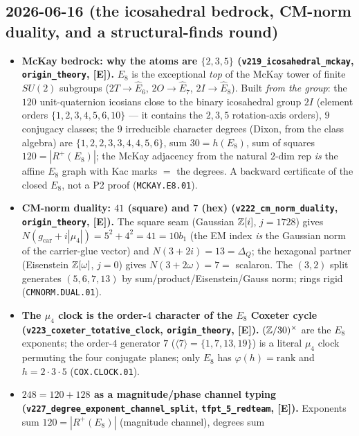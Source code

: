 \documentclass[11pt]{article}
\providecommand{\mE}{\textbf{[E]}}\providecommand{\mC}{\textbf{[C]}}
\providecommand{\gcar}{g_{\mathrm{car}}}\providecommand{\Nfam}{N_{\mathrm{fam}}}
\begin{document}
\subsection*{2026-06-16 (the icosahedral bedrock, CM-norm duality, and a structural-finds round)}
\begin{itemize}
\item \textbf{McKay bedrock: why the atoms are $\{2,3,5\}$ (\texttt{v219\_icosahedral\_mckay},
  \texttt{origin\_theory}, \mE).} $E_8$ is the exceptional \emph{top} of the McKay tower of finite
  $SU(2)$ subgroups ($2T{\to}\hat E_6$, $2O{\to}\hat E_7$, $2I{\to}\hat E_8$). Built \emph{from the
  group}: the $120$ unit-quaternion icosians close to the binary icosahedral group $2I$ (element orders
  $\{1,2,3,4,5,6,10\}$ --- it contains the $2,3,5$ rotation-axis orders), $9$ conjugacy classes; the
  $9$ irreducible character degrees (Dixon, from the class algebra) are $\{1,2,2,3,3,4,4,5,6\}$, sum
  $30{=}h(E_8)$, sum of squares $120{=}|R^+(E_8)|$; the McKay adjacency from the natural $2$-dim rep
  \emph{is} the affine $E_8$ graph with Kac marks $=$ the degrees. A backward certificate of the closed
  $E_8$, not a P2 proof (\texttt{MCKAY.E8.01}).
\item \textbf{CM-norm duality: $41$ (square) and $7$ (hex) (\texttt{v222\_cm\_norm\_duality},
  \texttt{origin\_theory}, \mE).} The square seam (Gaussian $\mathbb{Z}[i]$, $j{=}1728$) gives
  $N(\gcar{+}i|\mu_4|){=}5^2{+}4^2{=}41{=}10b_1$ (the EM index \emph{is} the Gaussian norm of the
  carrier-glue vector) and $N(3{+}2i){=}13{=}\Delta_Q$; the hexagonal partner (Eisenstein $\mathbb{Z}[\omega]$,
  $j{=}0$) gives $N(3{+}2\omega){=}7{=}$ scalaron. The $(3,2)$ split generates $(5,6,7,13)$ by
  sum/product/Eisenstein/Gauss norm; rings rigid (\texttt{CMNORM.DUAL.01}).
\item \textbf{The $\mu_4$ clock is the order-$4$ character of the $E_8$ Coxeter cycle
  (\texttt{v223\_\allowbreak coxeter\_\allowbreak totative\_\allowbreak clock}, \texttt{origin\_theory}, \mE).} $(\mathbb{Z}/30)^\times$ are the
  $E_8$ exponents; the order-$4$ generator $7$ ($\langle7\rangle{=}\{1,7,13,19\}$) is a literal $\mu_4$
  clock permuting the four conjugate planes; only $E_8$ has $\varphi(h){=}\mathrm{rank}$ and
  $h{=}2{\cdot}3{\cdot}5$ (\texttt{COX.CLOCK.01}).
\item \textbf{$248{=}120{+}128$ as a magnitude/phase channel typing
  (\texttt{v227\_\allowbreak degree\_\allowbreak exponent\_\allowbreak channel\_\allowbreak split},
  \texttt{tfpt\_5\_redteam}, \mE).} Exponents sum $120{=}|R^+(E_8)|$ (magnitude channel), degrees sum

\end{itemize}
\end{document}
